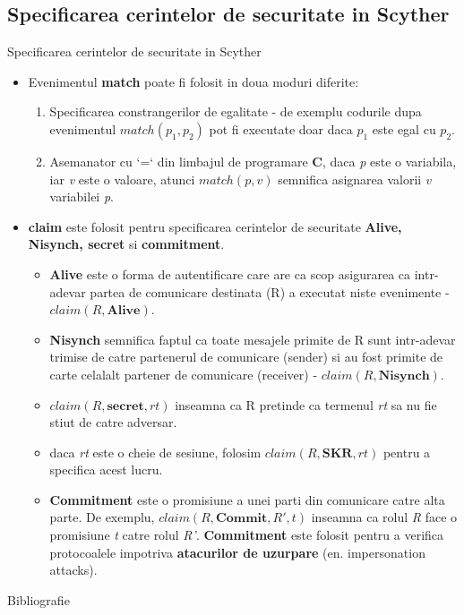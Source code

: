 \documentclass[11pt]{beamer}
\begin{document}
\subsection{Specificarea cerintelor de securitate in Scyther}
\begin{frame}[t,allowframebreaks]{Specificarea cerintelor de securitate in Scyther}

\begin{itemize}

\item Evenimentul \textbf{match} poate fi folosit in doua moduri diferite:

	\begin{enumerate}

	\item Specificarea constrangerilor de egalitate - de exemplu codurile dupa evenimentul $match(p_1, p_2)$ pot fi executate doar daca $p_1$ este egal cu $p_2$.
	\item Asemanator cu `=` din limbajul de programare \textbf{C}, daca \textit{p} este o variabila, iar \textit{v} este o valoare, atunci $match(p, v)$ semnifica asignarea valorii \textit{v} variabilei \textit{p}.
	
	\end{enumerate}
	
\item \textbf{claim} este folosit pentru specificarea cerintelor de securitate \textbf{Alive, Nisynch, secret} si \textbf{commitment}.
	\begin{itemize}

	\item \textbf{Alive} este o forma de autentificare care are ca scop asigurarea ca intr-adevar partea de comunicare destinata (R) a executat niste evenimente - $claim(R,\textbf{Alive})$.
	
	\item \textbf{Nisynch} semnifica faptul ca toate mesajele primite de R sunt intr-adevar trimise de catre partenerul de comunicare (sender) si au fost primite de carte celalalt partener de comunicare (receiver) - $claim(R,\textbf{Nisynch})$.
	
	\item $claim(R, \textbf{secret}, rt)$ inseamna ca R pretinde ca termenul \textit{rt} sa nu fie stiut de catre adversar.
	
	\item daca \textit{rt} este o cheie de sesiune, folosim $claim(R,\textbf{SKR}, rt)$ pentru a specifica acest lucru.
	
	\item \textbf{Commitment} este o promisiune a unei parti din comunicare catre alta parte. De exemplu, $claim(R,\textbf{Commit}, R', t)$ inseamna ca rolul \textit{R} face o promisiune \textit{t} catre rolul \textit{R'}. \textbf{Commitment} este folosit pentru a verifica protocoalele impotriva \textbf{atacurilor de uzurpare} (en. impersonation attacks).
	
	\end{itemize}

\end{itemize}

\end{frame}

\begin{frame}{Bibliografie}
\printbibliography
\end{frame}
\end{document}
